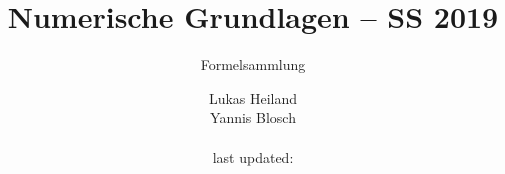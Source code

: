 \documentclass{scrartcl}
\begin{document}
	
	
	\title{Numerische Grundlagen -- SS 2019}
	\subtitle{Formelsammlung}
	\author{Lukas Heiland\\Yannis Blosch \\\\ last updated:}
	
	\maketitle
	
	\pagebreak
	
	\setcounter{tocdepth}{2}	
	\tableofcontents
	
	\pagebreak
	
	
	
	\pagebreak
	
	
	
	
	
	
	
	
\end{document}
